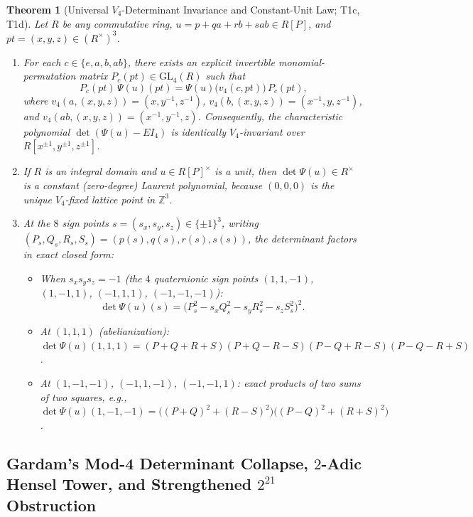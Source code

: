 \documentclass[11pt,reqno]{amsart}
\newtheorem{theorem}{Theorem}[section]
\theoremstyle{definition}
\newcommand{\Z}{\mathbb{Z}}
\begin{document}
\begin{theorem}[Universal $V_4$-Determinant Invariance and Constant-Unit Law; \textsf{T1c}, \textsf{T1d}]
\label{thm:t1cd}
Let $R$ be any commutative ring, $u = p + qa + rb + sab \in R[P]$, and $pt = (x,y,z) \in (R^\times)^3$.
\begin{enumerate}[leftmargin=2em]
  \item For each $c \in \{e, a, b, ab\}$, there exists an explicit invertible monomial-permutation
    matrix $P_c(pt) \in \mathrm{GL}_4(R)$ such that
    \[
      P_c(pt)\, \Psi(u)(pt) = \Psi(u)\bigl(v_4(c, pt)\bigr)\, P_c(pt),
    \]
    where $v_4(a, (x,y,z)) = (x, y^{-1}, z^{-1})$, $v_4(b, (x,y,z)) = (x^{-1}, y, z^{-1})$, and
    $v_4(ab, (x,y,z)) = (x^{-1}, y^{-1}, z)$. Consequently, the characteristic polynomial
    $\det(\Psi(u) - E I_4)$ is identically $V_4$-invariant over $R[x^{\pm 1}, y^{\pm 1}, z^{\pm 1}]$.
  \item If $R$ is an integral domain and $u \in R[P]^\times$ is a unit, then $\det\Psi(u) \in R^\times$
    is a \emph{constant} (zero-degree) Laurent polynomial, because $(0,0,0)$ is the unique
    $V_4$-fixed lattice point in $\Z^3$.
  \item At the $8$ sign points $s = (s_x, s_y, s_z) \in \{\pm 1\}^3$, writing $(P_s,Q_s,R_s,S_s) = (p(s),q(s),r(s),s(s))$,
    the determinant factors in exact closed form:
    \begin{itemize}[leftmargin=1.5em]
      \item When $s_x s_y s_z = -1$ (the $4$ quaternionic sign points $(1,1,-1)$, $(1,-1,1)$, $(-1,1,1)$, $(-1,-1,-1)$):
        \begin{equation}
          \label{eq:quat-square}
          \det\Psi(u)(s) = \bigl(P_s^2 - s_x Q_s^2 - s_y R_s^2 - s_z S_s^2\bigr)^2.
        \end{equation}
      \item At $(1,1,1)$ (abelianization): $\det\Psi(u)(1,1,1) = (P+Q+R+S)(P+Q-R-S)(P-Q+R-S)(P-Q-R+S)$.
      \item At $(1,-1,-1)$, $(-1,1,-1)$, $(-1,-1,1)$: exact products of two sums of two squares,
        e.g., $\det\Psi(u)(1,-1,-1) = \bigl((P+Q)^2 + (R-S)^2\bigr)\bigl((P-Q)^2 + (R+S)^2\bigr)$.
    \end{itemize}
\end{enumerate}
\end{theorem}

\subsection{Gardam's Mod-4 Determinant Collapse, $2$-Adic Hensel Tower, and Strengthened $2^{21}$ Obstruction}
\end{document}
